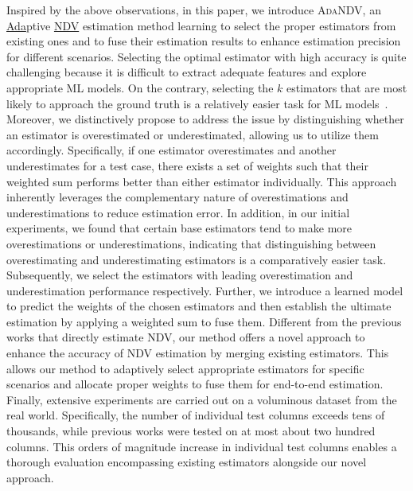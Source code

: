 Inspired by the above observations, in this paper, we introduce \textsc{AdaNDV}, an \underline{Ada}ptive \underline{NDV} estimation method learning to select the proper estimators from existing ones and to fuse their estimation results to enhance estimation precision for different scenarios.
Selecting the optimal estimator with high accuracy is quite challenging because it is difficult to extract adequate features and explore appropriate ML models.
{On the contrary, selecting the $k$ estimators that are most likely to approach the ground truth is a relatively easier task for ML models~\cite{liu2009learning}. 
}
Moreover, we distinctively propose to address the issue by distinguishing whether an estimator is overestimated or underestimated, allowing us to utilize them accordingly.
{Specifically, if one estimator overestimates and another underestimates for a test case, there exists a set of weights such that their weighted sum performs better than either estimator individually.}
This approach inherently leverages the complementary nature of overestimations and underestimations to reduce estimation error. 
{In addition, in our initial experiments, we found that certain base estimators tend to make more overestimations or underestimations, indicating that distinguishing between overestimating and underestimating estimators is a comparatively easier task.}
Subsequently, we select the estimators with leading overestimation and underestimation performance respectively.
Further, we introduce a learned model to predict the weights of the chosen estimators and then establish the ultimate estimation by applying a weighted sum to fuse them. 
Different from the previous works that directly estimate NDV, our method offers a novel approach to enhance the accuracy of NDV estimation by merging existing estimators.
This allows our method to adaptively select appropriate estimators for specific scenarios and allocate proper weights to fuse them for end-to-end estimation.
Finally, extensive experiments are carried out on a voluminous dataset from the real world. Specifically, the number of individual test columns exceeds tens of thousands, while previous works were tested on at most about two hundred columns. This orders of magnitude increase in individual test columns enables a thorough evaluation encompassing existing estimators alongside our novel approach.






